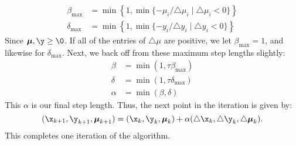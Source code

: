 \begin{align*}
\beta_{\max} &= \min\left\{1, \min\{-\mu_i/\triangle \mu_i \mid \triangle \mu_i < 0 \}\right\}\\
\delta_{\max} &= \min\left\{1, \min\{-y_i/\triangle y_i \mid \triangle y_i < 0 \}\right\}
\end{align*}
Since $\Mu,\y \geq \0$.
If all of the entries of $\triangle \mu$ are positive, we let $\beta_{\max} = 1$, and likewise for $\delta_{\max}$.
Next, we back off from these maximum step lengths slightly:
\begin{align*}
\beta &= \min(1, \tau\beta_{\max})\\
\delta &= \min(1, \tau\delta_{\max})\\
\alpha &= \min(\beta, \delta)
\end{align*}
This $\alpha$ is our final step length.
Thus, the next point in the iteration is given by:
\[
(\x_{k+1}, \y_{k+1}, \Mu_{k+1}) = (\x_k, \y_k, \Mu_k) + \alpha(\triangle \x_k, \triangle \y_k, \triangle \Mu_k).
\]
This completes one iteration of the algorithm.

\begin{comment} %
\begin{info}
As with our Interior Point method for linear constrained optimization, the most expensive part of each iteration is solving the linear systems \ref{eq:affine} and \ref{eq:perturbed}.
Note, however, that these systems both have the same matrix on the left-hand side.
This allows us to factor the matrix just once per iteration, and use the factorization to solve both systems.
A more sophisticated implementation would likely split up these large systems of equations into a few smaller ones, and then use Cholesky-based factorizations.
To simplify matters, we suggest simply using as a first attempt an LU decomposition on the entire matrix.
\end{info}
\end{comment}

